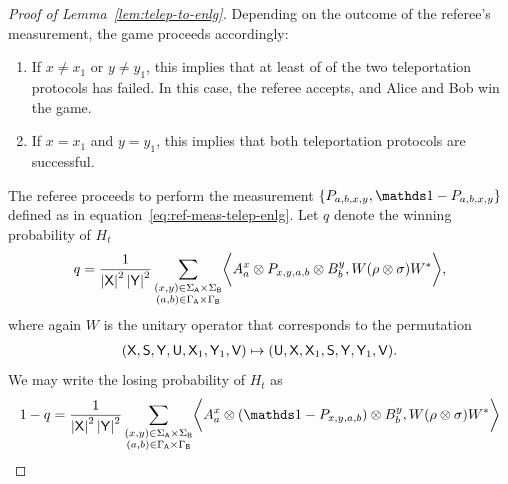 \begin{proof}[Proof of Lemma~\ref{lem:telep-to-enlg}]
Depending on the outcome of the referee's measurement, the game proceeds accordingly:
\begin{enumerate}
	\item If $x \not= x_1$ or $y \not= y_1$, this implies that at least of of the two teleportation protocols has failed. In this case, the referee accepts, and Alice and Bob win the game. 
	\item If $x = x_1$ and $y = y_1$, this implies that both teleportation protocols are successful.
\end{enumerate}
The referee proceeds to perform the measurement $\{P_{a,b,x,y}, \I - P_{a,b,x,y} \}$ defined as in equation~\eqref{eq:ref-meas-telep-enlg}. Let $q$ denote the winning probability of $H_t$
\begin{align}
	q = \frac{1}{\left\lvert \mathsf{X} \right\rvert^2\left\lvert \mathsf{Y} \right\rvert^2} \sum_{\substack{(x,y) \in \Sigma_{\mathsf{A}} \times \Sigma_{\mathsf{B}} \\ (a,b) \in \Gamma_{\mathsf{A}} \times \Gamma_{\mathsf{B}}}} \biggl\langle A_a^x \otimes P_{x,y,a,b} \otimes B_b^y, W (\rho \otimes \sigma) W^* \biggr\rangle,
\end{align}
where again $W$ is the unitary operator that corresponds to the permutation 
\begin{align}
	(\mathsf{X},\mathsf{S},\mathsf{Y},\mathsf{U},\mathsf{X}_1,\mathsf{Y}_1,\mathsf{V}) \mapsto (\mathsf{U},\mathsf{X},\mathsf{X}_1,\mathsf{S},\mathsf{Y},\mathsf{Y}_1,\mathsf{V}).
\end{align}
We may write the losing probability of $H_t$ as 
\begin{equation}
	\begin{aligned}
		1-q &= \frac{1}{\abs{\reg{X}}^2\abs{\reg{Y}}^2} \sum_{\substack{(x,y) \in \SigmaA \times \SigmaB \\ (a,b) \in \GammaA \times \GammaB}} \biggip{A_a^x \otimes (\I - P_{x,y,a,b}) \otimes B_b^y}{W (\rho \otimes \sigma) W^*} \\

\end{aligned}
\end{equation}
\end{proof}
